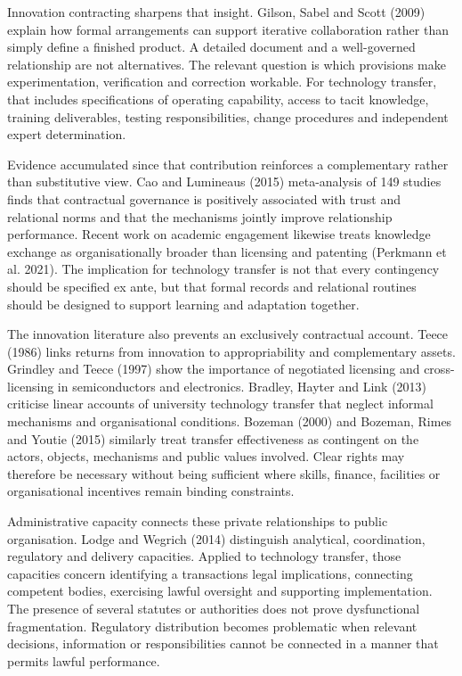 \documentclass[
]{article}
\begin{document}
Innovation contracting sharpens that insight. Gilson, Sabel and Scott
(2009) explain how formal arrangements can support iterative
collaboration rather than simply define a finished product. A detailed
document and a well-governed relationship are not alternatives. The
relevant question is which provisions make experimentation, verification
and correction workable. For technology transfer, that includes
specifications of operating capability, access to tacit knowledge,
training deliverables, testing responsibilities, change procedures and
independent expert determination.

Evidence accumulated since that contribution reinforces a complementary
rather than substitutive view. Cao and Lumineau\textquotesingle s (2015)
meta-analysis of 149 studies finds that contractual governance is
positively associated with trust and relational norms and that the
mechanisms jointly improve relationship performance. Recent work on
academic engagement likewise treats knowledge exchange as
organisationally broader than licensing and patenting (Perkmann et al.
2021). The implication for technology transfer is not that every
contingency should be specified ex ante, but that formal records and
relational routines should be designed to support learning and
adaptation together.

The innovation literature also prevents an exclusively contractual
account. Teece (1986) links returns from innovation to appropriability
and complementary assets. Grindley and Teece (1997) show the importance
of negotiated licensing and cross-licensing in semiconductors and
electronics. Bradley, Hayter and Link (2013) criticise linear accounts
of university technology transfer that neglect informal mechanisms and
organisational conditions. Bozeman (2000) and Bozeman, Rimes and Youtie
(2015) similarly treat transfer effectiveness as contingent on the
actors, objects, mechanisms and public values involved. Clear rights may
therefore be necessary without being sufficient where skills, finance,
facilities or organisational incentives remain binding constraints.

Administrative capacity connects these private relationships to public
organisation. Lodge and Wegrich (2014) distinguish analytical,
coordination, regulatory and delivery capacities. Applied to technology
transfer, those capacities concern identifying a
transaction\textquotesingle s legal implications, connecting competent
bodies, exercising lawful oversight and supporting implementation. The
presence of several statutes or authorities does not prove dysfunctional
fragmentation. Regulatory distribution becomes problematic when relevant
decisions, information or responsibilities cannot be connected in a
manner that permits lawful performance.
\end{document}

